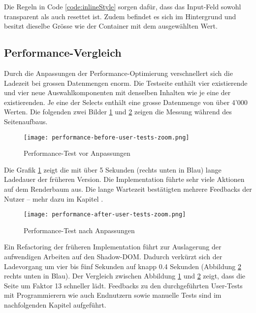 Die Regeln in Code \ref{code:inlineStyle} sorgen dafür, dass das Input-Feld sowohl transparent als auch resettet ist. 
Zudem befindet es sich im Hintergrund und besitzt dieselbe Grösse wie der Container mit dem ausgewählten Wert. 


\subsection{Performance-Vergleich}
\label{sec:performanceCompare}

Durch die Anpassungen der Performance-Optimierung verschnellert sich die Ladezeit bei grossen Datenmengen enorm. 
Die Testseite enthält vier existierende und vier neue Auswahlkomponenten mit denselben Inhalten wie je eine der existierenden. 
Je eine der Selects enthält eine grosse Datenmenge von über 4'000 Werten. 
Die folgenden zwei Bilder \ref{img:performanceTestBefore} und \ref{img:performanceTestAfter} zeigen die Messung während des Seitenaufbaus. 

\begin{figure}[!htb]
    \centering
    \texttt{[image: performance-before-user-tests-zoom.png]}
    \caption{\centering Performance-Test vor Anpassungen}
    \label{img:performanceTestBefore}
\end{figure}

Die Grafik \ref{img:performanceTestBefore} zeigt die mit über 5 Sekunden (rechts unten in Blau) lange Ladedauer der früheren Version. 
Die Implementation führte sehr viele Aktionen auf dem Renderbaum aus. 
Die lange Wartezeit bestätigten mehrere Feedbacks der Nutzer – mehr dazu im Kapitel \textbf{}. 

\begin{figure}[!htb]
    \centering
    \texttt{[image: performance-after-user-tests-zoom.png]}
    \caption{\centering Performance-Test nach Anpassungen}
    \label{img:performanceTestAfter}
\end{figure}

Ein Refactoring der früheren Implementation führt zur Auslagerung der aufwendigen Arbeiten auf den Shadow-DOM. 
Dadurch verkürzt sich der Ladevorgang um vier bis fünf Sekunden auf knapp 0.4 Sekunden (Abbildung \ref{img:performanceTestAfter} rechts unten in Blau). 
Der Vergleich zwischen Abbildung \ref{img:performanceTestBefore} und \ref{img:performanceTestAfter} zeigt, dass die Seite um Faktor 13 schneller lädt. 
Feedbacks zu den durchgeführten User-Tests mit Programmierern wie auch Endnutzern sowie manuelle Tests sind im nachfolgenden Kapitel aufgeführt. 


